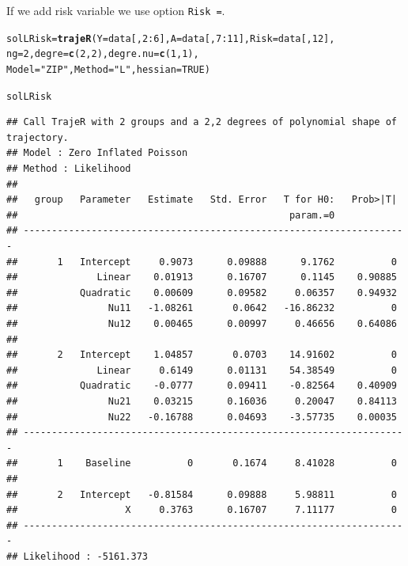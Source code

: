 \documentclass{article}\usepackage[]{graphicx}\usepackage[]{color}
\makeatletter
\newcommand{\hlnum}[1]{\textcolor[rgb]{0.686,0.059,0.569}{#1}}%
\newcommand{\hlstr}[1]{\textcolor[rgb]{0.192,0.494,0.8}{#1}}%
\newcommand{\hlopt}[1]{\textcolor[rgb]{0,0,0}{#1}}%
\newcommand{\hlstd}[1]{\textcolor[rgb]{0.345,0.345,0.345}{#1}}%
\newcommand{\hlkwb}[1]{\textcolor[rgb]{0.69,0.353,0.396}{#1}}%
\newcommand{\hlkwc}[1]{\textcolor[rgb]{0.333,0.667,0.333}{#1}}%
\newcommand{\hlkwd}[1]{\textcolor[rgb]{0.737,0.353,0.396}{\textbf{#1}}}%
\newenvironment{kframe}{%
 \def\at@end@of@kframe{}%
 \ifinner\ifhmode%
  \def\at@end@of@kframe{\end{minipage}}%
  \begin{minipage}{\columnwidth}%
 \fi\fi%
 \def\FrameCommand##1{\hskip\@totalleftmargin \hskip-\fboxsep
 \colorbox{shadecolor}{##1}\hskip-\fboxsep
     \hskip-\linewidth \hskip-\@totalleftmargin \hskip\columnwidth}%
 \MakeFramed {\advance\hsize-\width
   \@totalleftmargin\z@ \linewidth\hsize
   \@setminipage}}%
 {\par\unskip\endMakeFramed%
 \at@end@of@kframe}
\newenvironment{knitrout}{}{} %
\makeatother
\begin{document}
If we add risk variable we use option \verb|Risk =|.
\begin{knitrout}
\color{fgcolor}\begin{kframe}
\begin{alltt}
\hlstd{solLRisk} \hlkwb{=} \hlkwd{trajeR}\hlstd{(}\hlkwc{Y} \hlstd{= data[,}\hlnum{2}\hlopt{:}\hlnum{6}\hlstd{],} \hlkwc{A} \hlstd{= data[,}\hlnum{7}\hlopt{:}\hlnum{11}\hlstd{],} \hlkwc{Risk} \hlstd{= data[,}\hlnum{12}\hlstd{],}
                  \hlkwc{ng} \hlstd{=} \hlnum{2}\hlstd{,} \hlkwc{degre}\hlstd{=}\hlkwd{c}\hlstd{(}\hlnum{2}\hlstd{,}\hlnum{2}\hlstd{),} \hlkwc{degre.nu} \hlstd{=} \hlkwd{c}\hlstd{(}\hlnum{1}\hlstd{,}\hlnum{1}\hlstd{),}
                  \hlkwc{Model}\hlstd{=}\hlstr{"ZIP"}\hlstd{,} \hlkwc{Method} \hlstd{=} \hlstr{"L"}\hlstd{,} \hlkwc{hessian} \hlstd{=} \hlnum{TRUE}\hlstd{)}
\end{alltt}
\end{kframe}
\end{knitrout}
\begin{knitrout}
\color{fgcolor}\begin{kframe}
\begin{alltt}
\hlstd{solLRisk}
\end{alltt}
\begin{verbatim}
## Call TrajeR with 2 groups and a 2,2 degrees of polynomial shape of trajectory.
## Model : Zero Inflated Poisson
## Method : Likelihood 
##  
##   group   Parameter   Estimate   Std. Error   T for H0:   Prob>|T|  
##                                                param.=0             
## --------------------------------------------------------------------
##       1   Intercept     0.9073      0.09888      9.1762          0  
##              Linear    0.01913      0.16707      0.1145    0.90885  
##           Quadratic    0.00609      0.09582     0.06357    0.94932  
##                Nu11   -1.08261       0.0642   -16.86232          0  
##                Nu12    0.00465      0.00997     0.46656    0.64086  
##                                                                     
##       2   Intercept    1.04857       0.0703    14.91602          0  
##              Linear     0.6149      0.01131    54.38549          0  
##           Quadratic    -0.0777      0.09411    -0.82564    0.40909  
##                Nu21    0.03215      0.16036     0.20047    0.84113  
##                Nu22   -0.16788      0.04693    -3.57735    0.00035  
## --------------------------------------------------------------------
##       1    Baseline          0       0.1674     8.41028          0  
##                                                                     
##       2   Intercept   -0.81584      0.09888     5.98811          0  
##                   X     0.3763      0.16707     7.11177          0  
## --------------------------------------------------------------------
## Likelihood : -5161.373
\end{verbatim}
\end{kframe}
\end{knitrout}
\end{document}

